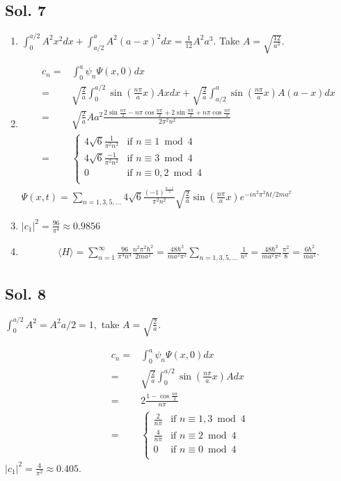 \subsection*{Sol. 7}
\begin{enumerate}
    \item $\int_0^{a/2}A^2x^2dx + \int_{a/2}^{a}A^2(a-x)^2dx=
    \frac{1}{12}A^2a^3.
    $ Take $A=\sqrt{\frac{12}{a^3}}.$
    \item 
    \begin{align*}
        c_n =& \int_0^a\psi_n\Psi(x,0)dx \\
        =& 
        \sqrt{\frac{2}{a}}\int_0^{a/2}\sin(\frac{n\pi}{a}x)Axdx
        +
        \sqrt{\frac{2}{a}}\int_{a/2}^{a}\sin(\frac{n\pi}{a}x)A(a-x)dx\\
        =&\sqrt{\frac{2}{a}}Aa^2
        \frac{2\sin\frac{n\pi}{2}-n\pi\cos\frac{n\pi}{2}
        +2\sin\frac{n\pi}{2}+n\pi\cos\frac{n\pi}{2}
        }{2\pi^2n^2}\\
        =&\begin{cases}
  4\sqrt{6}\frac{1}{\pi^2n^2}& \text{if }  n\equiv 1 \bmod 4 \\
  4\sqrt{6}\frac{-1}{\pi^2n^2}& \text{if }  n\equiv 3 \bmod 4 \\
  0 & \text{if } n\equiv 0, 2 \bmod 4 \\
\end{cases}
    \end{align*}
    $
    \Psi(x,t) = 
    \sum_{n=1,3,5,\dots}
    4\sqrt{6}\frac{(-1)^{\frac{n-1}{2}}}{\pi^2n^2}
    \sqrt{\frac{2}{a}}
    \sin(\frac{n\pi}{a}x)e^{-in^2\pi^2\hbar t/2ma^2}
    $
    \item $|c_1|^2 = \frac{96}{\pi^4} \approx 0.9856$
    \item 
    \begin{align*}
        \langle
        H
        \rangle
        =\sum_{n=1}^\infty
        \frac{96}{\pi^4n^4}\frac{n^2\pi^2\hbar^2}{2ma^2}
        =\frac{48\hbar^2}{ma^2\pi^2}\sum_{n=1,3,5,\dots}\frac{1}{n^2}=
        \frac{48\hbar^2}{ma^2\pi^2}\frac{\pi^2}{8}
        =\frac{6\hbar^2}{ma^2}.
    \end{align*}
\end{enumerate}

\subsection*{Sol. 8}
$\int_0^{a/2}A^2= A^2a/2=1,$ take $A=\sqrt{\frac{2}{a}}.$

\begin{align*}
c_n=&\int_0^{a}\psi_n\Psi(x,0)dx\\
=&\sqrt{\frac{2}{a}}
\int_0^{a/2}\sin(\frac{n\pi}{a}x)Adx\\
=&2\frac{1-\cos\frac{n\pi}{2}}{n\pi}\\
=&\begin{cases}
  \frac{2}{n\pi} & \text{if } n\equiv 1,3 \bmod 4 \\
  \frac{4}{n\pi} & \text{if } n\equiv 2 \bmod 4 \\
  0 & \text{if } n\equiv 0 \bmod 4 \\
\end{cases}
\end{align*}
$|c_1|^2=\frac{4}{\pi^2}\approx0.405.$


